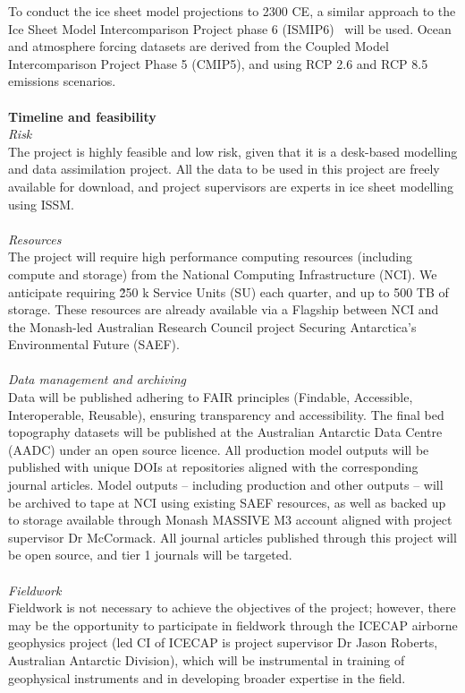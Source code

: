 \documentclass[10pt,a4paper]{article}
\begin{document}
To conduct the ice sheet model projections to 2300 CE, a similar approach to the Ice Sheet Model Intercomparison Project phase 6 (ISMIP6)~\cite{ISMIP6} will be used. Ocean and atmosphere forcing datasets are derived from the Coupled Model Intercomparison Project Phase 5 (CMIP5), and using RCP 2.6 and RCP 8.5 emissions scenarios.\\
\\\textbf{Timeline and feasibility}\\
\textit{Risk}\\
The project is highly feasible and low risk, given that it is a desk-based modelling and data assimilation project. All the data to be used in this project are freely available for download, and project supervisors are experts in ice sheet modelling using ISSM.\\
\\\textit{Resources}\\
The project will require high performance computing resources (including compute and storage) from the National Computing Infrastructure (NCI). We anticipate requiring \~250 k Service Units (SU) each quarter, and up to 500 TB of storage. These resources are already available via a Flagship between NCI and the Monash-led Australian Research Council project Securing Antarctica’s Environmental Future (SAEF).\\
\\\textit{Data management and archiving}\\
Data will be published adhering to FAIR principles (Findable, Accessible, Interoperable, Reusable), ensuring transparency and accessibility. The final bed topography datasets will be published at the Australian Antarctic Data Centre (AADC) under an open source licence. All production model outputs will be published with unique DOIs at repositories aligned with the corresponding journal articles. Model outputs – including production and other outputs – will be archived to tape at NCI using existing SAEF resources, as well as backed up to storage available through Monash MASSIVE M3 account aligned with project supervisor Dr McCormack. All journal articles published through this project will be open source, and tier 1 journals will be targeted.\\
\\\textit{Fieldwork}\\
Fieldwork is not necessary to achieve the objectives of the project; however, there may be the opportunity to participate in fieldwork through the ICECAP airborne geophysics project (led CI of ICECAP is project supervisor Dr Jason Roberts, Australian Antarctic Division), which will be instrumental in training of geophysical instruments and in developing broader expertise in the field. \\
\end{document}
